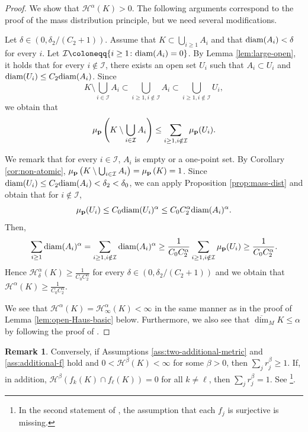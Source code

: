\documentclass[a4paper, reqno, 11pt]{amsart}
\theoremstyle{definition}
\newtheorem{Rem}[Thm]{Remark}
\begin{document}
\begin{proof}
We show that $ \mathcal{H}^{\alpha}(K) > 0$. 
The following arguments correspond to the proof of the mass distribution principle, but we need several modifications. 

Let $\delta \in (0, \delta_2 /(C_2 + 1))$. 
Assume that $K \subset \bigcup_{i \ge 1} A_i$ and that $\textup{diam}(A_i) < \delta$ for every $i$. 
Let $\mathcal{I} \coloneqq \{i \ge 1 \colon \textup{diam}(A_i) = 0\}$.   
By Lemma \ref{lem:large-open}, 
it holds that for every $i \notin \mathcal{I}$, there exists an open set $U_i$ such that $A_i \subset U_i$ and $\textup{diam}(U_i) \le C_2 \textup{diam}(A_i)$. 
Since 
\[ K \setminus \bigcup_{i \in \mathcal{I}} A_i \subset  \bigcup_{i \ge 1, i \notin \mathcal{I}} A_i \subset  \bigcup_{i \ge 1, i \notin \mathcal{I}} U_i, \]
we obtain that 
\[ \mu_{\bf p}\left( K \setminus \bigcup_{i \in \mathcal{I}} A_i  \right) \le \sum_{i \ge 1, i \notin \mathcal{I}} \mu_{\bf p}(U_i). \]

We remark that for every $i \in \mathcal{I}$, $A_i$ is empty or a one-point set. 
By Corollary \ref{cor:non-atomic}, $ \mu_{\bf p}\left( K \setminus \bigcup_{i \in \mathcal{I}} A_i  \right)  =  \mu_{\bf p}\left( K \right)  = 1$. 
Since $ \textup{diam}(U_i) \le C_2 \textup{diam}(A_i) < \delta_2 < \delta_0$, 
we can apply Proposition \ref{prop:mass-dist} and obtain that for $i \notin \mathcal{I}$, 
\[ \mu_{\bf p}(U_i) \le C_0  \textup{diam}(U_i) ^{\alpha} \le C_0 C_2^{\alpha} \textup{diam}(A_i)^{\alpha}.\] 
Then, 
\[ \sum_{i \ge 1} \textup{diam}(A_i)^{\alpha} = \sum_{i \ge 1, i \notin \mathcal{I}} \textup{diam}(A_i)^{\alpha} \ge \frac{1}{C_0 C_2^{\alpha}} \sum_{i \ge 1, i \notin \mathcal{I}} \mu_{\bf p}(U_i) \ge  \frac{1}{C_0 C_2^{\alpha}}.  \]
Hence $\mathcal{H}^{\alpha}_{\delta}(K) \ge  \frac{1}{C_0 C_2^{\alpha}}$ for every $\delta \in (0,\delta_2 /(C_2 + 1))$ and we obtain that $\mathcal{H}^{\alpha}(K) \ge  \frac{1}{C_0 C_2^{\alpha}}$. 

We see that $\mathcal{H}^{\alpha}(K) = \mathcal{H}^{\alpha}_{\infty}(K)  < \infty$ in the same manner as in the proof of Lemma \ref{lem:open-Haus-basic} below. 
Furthermore, we also see that $\overline{\dim}_M K \le \alpha$ by following the proof of \cite[Theorem 2.2.2 (ii)]{BishopPeres2017}. 
\end{proof}

\begin{Rem}
Conversely, if  Assumptions \ref{ass:two-additional-metric} and \ref{ass:additional-f}  hold and $0 < \mathcal{H}^{\beta}(K) < \infty$ for some $\beta > 0$, 
then $\sum_{j} r_j^{\beta} \ge 1$. 
If, in addition, $\mathcal{H}^{\beta}(f_k (K) \cap f_{\ell}(K)) = 0$ for all $k \ne \ell$, then $\sum_{j} r_j^{\beta} = 1$. 
See \cite[Theorem 3]{BessenyeiPenzes2022}\footnote{In the second statement of \cite[Theorem 3]{BessenyeiPenzes2022}, the assumption that each $f_j$ is surjective is missing.}. 
\end{Rem}
\end{document}
